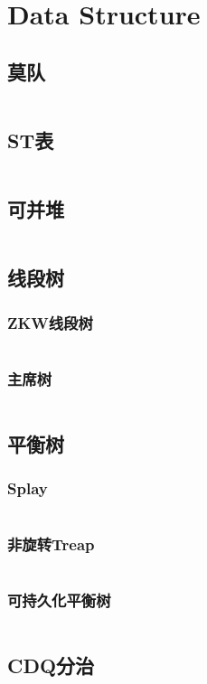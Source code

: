 \chapter{Data Structure}
\section{莫队}
\inputminted[linenos=true,frame=leftline]{cpp}{DataStructure/mo_dui.cpp}
\section{ST表}
\inputminted[linenos=true,frame=leftline]{cpp}{DataStructure/st_table.cpp}
\section{可并堆}
\inputminted[linenos=true,frame=leftline]{cpp}{DataStructure/mergeable_heap.cpp}
\section{线段树}
\subsection{ZKW线段树}
\inputminted[linenos=true,frame=leftline]{cpp}{DataStructure/zkw_segment_tree.cpp}
\subsection{主席树}
\inputminted[linenos=true,frame=leftline]{cpp}{DataStructure/chair_tree.cpp}
\section{平衡树}
\subsection{Splay}
\inputminted[linenos=true,frame=leftline]{cpp}{DataStructure/splay.cpp}
\subsection{非旋转Treap}
\inputminted[linenos=true,frame=leftline]{cpp}{DataStructure/treap_unrotated.cpp}
\subsection{可持久化平衡树}
\inputminted[linenos=true,frame=leftline]{cpp}{DataStructure/functional_treap.cpp}
\section{CDQ分治}
\inputminted[linenos=true,frame=leftline]{cpp}{DataStructure/cdq_divide.cpp}
